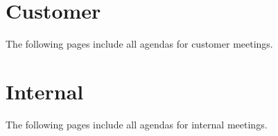 \newpage

\begin{figure}[htb]

\end{figure}

\newpage

\begin{figure}[htb]

\end{figure}

\newpage

\section{Customer}
The following pages include all agendas for customer meetings.
\newpage
\begin{figure}[htb]

\end{figure}

\newpage

\begin{figure}[htb]

\end{figure}

\newpage

\begin{figure}[htb]

\end{figure}

\newpage

\begin{figure}[htb]

\end{figure}

\newpage

\section{Internal}
The following pages include all agendas for internal meetings.
\newpage
\begin{figure}[htb]

\end{figure}

\newpage

\begin{figure}[htb]

\end{figure}

\newpage

